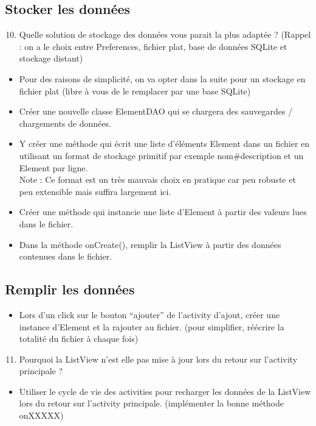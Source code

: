 \documentclass{article}
\begin{document}
  \subsection{Stocker les données}
  \begin{enumerate}
 \setcounter{enumi}{9}
\item Quelle solution de stockage des données vous parait la plus adaptée ?
(Rappel : on a le choix entre Preferences, fichier plat, base de données SQLite et stockage distant)
\end{enumerate}
 \begin{itemize}
  \item Pour des raisons de simplicité, on va opter dans la suite pour un stockage en fichier plat (libre à vous de le remplacer par une base SQLite)
  \item Créer une nouvelle classe ElementDAO qui se chargera des sauvegardes /
  chargements de données.
  \item Y créer une méthode qui écrit une liste d'éléments Element dans un
  fichier en utilisant un format de stockage primitif par exemple
  nom\#description et un Element par ligne.
  \\Note : Ce format est un très mauvais choix en pratique car peu robuste et
  peu extensible mais suffira largement ici.
  \item Créer une méthode qui instancie une liste d'Element à partir des valeurs
  lues dans le fichier.
  \item Dans la méthode onCreate(), remplir la ListView à partir des données contenues dans le fichier.
 \end{itemize}
 \subsection{Remplir les données}
 \begin{itemize}
  \item Lors d'un click sur le bouton ``ajouter'' de l'activity d'ajout, créer
  une instance d'Element et la rajouter au fichier. (pour simplifier, réécrire
  la totalité du fichier à chaque fois)
 \end{itemize}
  \begin{enumerate}
 \setcounter{enumi}{10}
\item Pourquoi la ListView n'est elle pas mise à jour lors du retour sur l'activity principale ?
\end{enumerate}
 \begin{itemize}
  \item Utiliser le cycle de vie des activities pour recharger les données de la ListView lors du retour sur l'activity principale. (implémenter la bonne méthode onXXXXX)
 \end{itemize}
\end{document}
